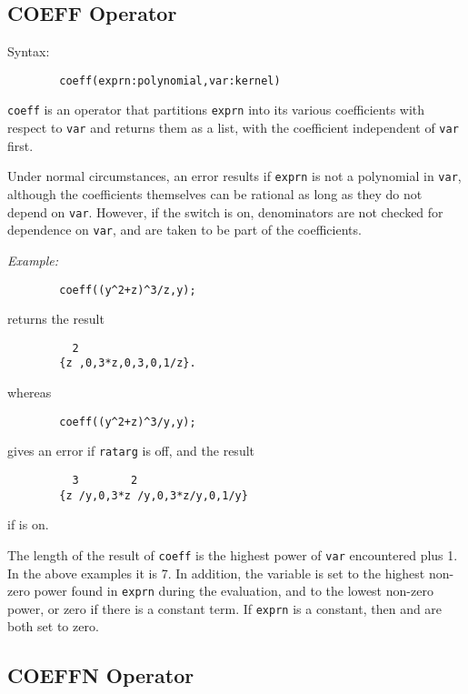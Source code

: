 \subsection{COEFF Operator}
\hypertarget{operator:COEFF}{}
\hypertarget{switch:RATARG}{}
Syntax:
\begin{verbatim}
        coeff(exprn:polynomial,var:kernel)
\end{verbatim}
\texttt{coeff} is an operator that partitions \texttt{exprn} into its various
coefficients with respect to \texttt{var} and returns them as a list, with
the coefficient independent of \texttt{var} first.

Under normal circumstances, an error results if \texttt{exprn} is not a
polynomial in \texttt{var}, although the coefficients themselves can be
rational as long as they do not depend on \texttt{var}.  However, if the
switch  is on, denominators are not checked for
dependence on \texttt{var}, and are taken to be part of the coefficients.

\textit{Example:}
\begin{verbatim}
        coeff((y^2+z)^3/z,y);
\end{verbatim}
returns the result
\begin{verbatim}
          2
        {z ,0,3*z,0,3,0,1/z}.
\end{verbatim}
whereas
\begin{verbatim}
        coeff((y^2+z)^3/y,y);
\end{verbatim}
gives an error if \texttt{ratarg} is off, and the result
\begin{verbatim}
          3        2
        {z /y,0,3*z /y,0,3*z/y,0,1/y}
\end{verbatim}
if  is on.

\hypertarget{reserved:HIGH_POW}{}
\hypertarget{reserved:LOW_POW}{}
The length of the result of \texttt{coeff} is the highest power of \texttt{var}
encountered plus 1.  In the above examples it is 7.  In addition, the
variable  is set to the highest non-zero
power found in \texttt{exprn} during the evaluation, and 
 to the lowest non-zero power, or zero if there is a
constant term.  If \texttt{exprn} is a constant, then  and
 are both set to zero.

\subsection{COEFFN Operator}
\hypertarget{operator:COEFFN}{}

